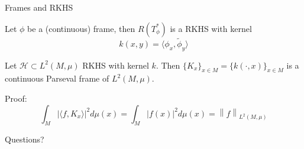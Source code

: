 \documentclass[10pt]{beamer}
\theoremstyle{definition} %
\newcommand{\norm}[1]{\left\lVert#1\right\rVert}
\begin{document}
\begin{frame}{Frames and RKHS}
   \begin{theorem}
    Let $\phi$ be a (continuous) frame, then $R(T^*_\phi)$ is a RKHS with kernel
    $$ k(x,y) = \langle \phi_x, \widetilde\phi_y \rangle$$
   \end{theorem}



\begin{theorem}
    Let $\mathcal{H} \subset L^2(M, \mu)$ RKHS with kernel $k$. Then $\{K_x\}_{x\in M} = \{k(\cdot, x)\}_{x\in M}$ is a continuous Parseval frame of $L^2(M, \mu)$.
\end{theorem}
Proof:
\[
    \int_M |\langle f, K_x \rangle|^2 d\mu(x) = \int_M |f(x)|^2 d\mu(x) = \norm{f}_{L^2(M, \mu)}
\]
\end{frame}

\begin{frame}[plain,c]

\begin{center}
\Huge Questions?
\end{center}
\end{frame}
    
\end{document}
